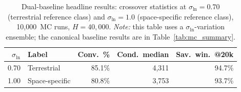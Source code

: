 \begin{table}[htbp]
\centering
\caption{Dual-baseline headline results: crossover statistics at $\sigma_{\ln} = 0.70$ (terrestrial reference class) and $\sigma_{\ln} = 1.0$ (space-specific reference class), 10{,}000~MC runs, $H = 40{,}000$. \emph{Note:} this table uses a $\sigma_{\ln}$-variation ensemble; the canonical baseline results are in Table~\ref{tab:mc_summary}.}
\label{tab:dual_baseline}
\small
\begin{tabular}{@{}rlrrr@{}}
\toprule
$\sigma_{\ln}$ & Label & Conv.\ \% & Cond.\ median & Sav.\ win.\ @20k \\
\midrule
0.70 & Terrestrial & 85.1\% & 4{,}311 & 94.7\% \\
1.00 & Space-specific & 80.8\% & 3{,}753 & 93.7\% \\
\bottomrule
\end{tabular}
\end{table}
